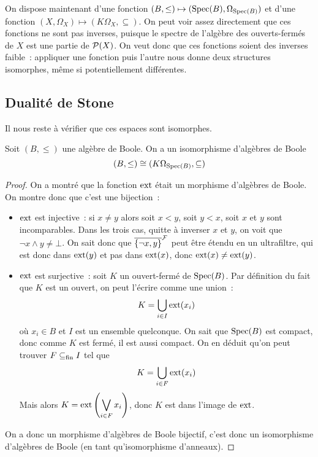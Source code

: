 On dispose maintenant d'une fonction
$(B,\leq) \mapsto (\operatorname{Spec}(B),\Omega_{\operatorname{Spec}(B)})$ et d'une fonction
$(X,\Omega_X)\mapsto (K\Omega_X,\subseteq)$. On peut voir assez directement
que ces fonctions ne sont pas inverses, puisque le spectre de l'algèbre des
ouverts-fermés de $X$ est une partie de $\mathcal{P}(X)$. On veut donc que ces
fonctions soient des inverses \og faible\fg~: appliquer une fonction puis
l'autre nous donne deux structures isomorphes, même si potentiellement
différentes.

\subsection{Dualité de Stone}

Il nous reste à vérifier que ces espaces sont isomorphes.

\begin{lemma}
  Soit $(B,\leq)$ une algèbre de Boole. On a un isomorphisme d'algèbres de Boole
  \[(B,\leq) \cong (K\Omega_{\operatorname{Spec}(B)},\subseteq)\]
\end{lemma}

\begin{proof}
  On a montré que la fonction $\operatorname{ext}$ était un morphisme d'algèbres de Boole.
  On montre donc que c'est une bijection~:
  \begin{itemize}
  \item $\operatorname{ext}$ est injective~: si $x\neq y$ alors soit $x < y$, soit
    $y < x$, soit $x$ et $y$ sont incomparables. Dans les trois cas,
    quitte à inverser $x$ et $y$, on voit que $\lnot x \land y \neq \bot$. On
    sait donc que $\overline{\{\lnot x,y\}}^{\mathcal F}$ peut être étendu en un ultrafiltre,
    qui est donc dans $\operatorname{ext}(y)$ et pas dans $\operatorname{ext}(x)$, donc
    $\operatorname{ext}(x)\neq\operatorname{ext}(y)$.
  \item $\operatorname{ext}$ est surjective~: soit $K$ un ouvert-fermé de $\operatorname{Spec}(B)$. Par
    définition du fait que $K$ est un ouvert, on peut l'écrire comme une union~:
    \[K = \bigcup_{i \in I} \operatorname{ext}(x_i)\]
    où $x_i \in B$ et $I$ est un ensemble quelconque. On sait que $\operatorname{Spec}(B)$
    est compact, donc comme $K$ est fermé, il est aussi compact. On en déduit
    qu'on peut trouver $F\subseteq_{\mathrm{fin}} I$ tel que
    \[K = \bigcup_{i \in F} \operatorname{ext}(x_i)\]
    Mais alors $\displaystyle K = \operatorname{ext}\left(\bigvee_{i \in F} x_i\right)$,
    donc $K$ est dans l'image de $\operatorname{ext}$.
  \end{itemize}

  On a donc un morphisme d'algèbres de Boole bijectif, c'est donc un
  isomorphisme d'algèbres de Boole (en tant qu'isomorphisme d'anneaux).
\end{proof}

